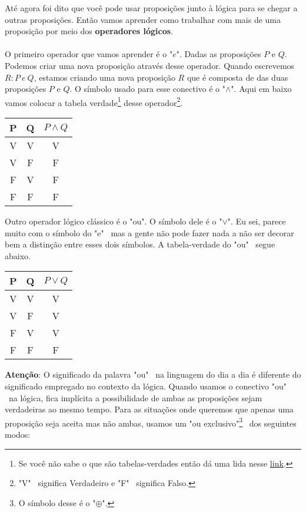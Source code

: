 \documentclass[a4paper,11pt]{book}
\theoremstyle{definition}
\theoremstyle{break}
\begin{document}
Até agora foi dito que você pode usar proposições junto à lógica para se chegar a outras proposições. Então vamos aprender como trabalhar com mais de uma proposição por meio dos \textbf{operadores lógicos}.
\\
\\
O primeiro operador que vamos aprender é o "$e$". Dadas as proposições $P$ e $Q$. Podemos criar uma nova proposição através desse operador. Quando escrevemos $R: P \ e \ Q$, estamos criando uma nova proposição $R$ que é composta de das duas proposições $P$ e $Q$. O símbolo usado para esse conectivo é o "$\land$". Aqui em baixo vamos colocar a tabela verdade\footnote{Se você não sabe o que são tabelas-verdades então dá uma lida nesse \href{https://www.youtube.com/watch?v=hWEZsyF3ZZc}{link}.} desse operador\footnote{"V" \ significa Verdadeiro e "F" \  significa Falso.}.

\begin{center}
\begin{tabular}{ c c || c }
 P & Q & $P \land Q$ \\ 
 \hline
 V & V & V \\  
 V & F & F \\  
 F & V & F \\  
 F & F & F
\end{tabular}
\end{center}

Outro operador lógico clássico é o "ou". O símbolo dele é o "$\lor$". Eu sei, parece muito com o símbolo do "e" \ mas a  gente não pode fazer nada a não ser decorar bem a distinção entre esses dois símbolos. A tabela-verdade do "ou" \ segue abaixo.

\begin{center}
\begin{tabular}{ c c || c }
 P & Q & $P \lor Q$ \\ 
 \hline
 V & V & V \\  
 V & F & V \\  
 F & V & V \\  
 F & F & F
\end{tabular}
\end{center}

\textbf{Atenção}: O significado da palavra "ou" \ na linguagem do dia a dia é diferente do significado empregado no contexto da lógica. Quando usamos o conectivo "ou" \ na lógica, fica implícita a possibilidade de ambas as proposições sejam verdadeiras ao mesmo tempo. Para as situações onde queremos que apenas uma proposição seja aceita mas não ambas, usamos um "ou exclusivo"\footnote{O símbolo desse é o "$\oplus$".} \ dos seguintes modos: 
\end{document}
